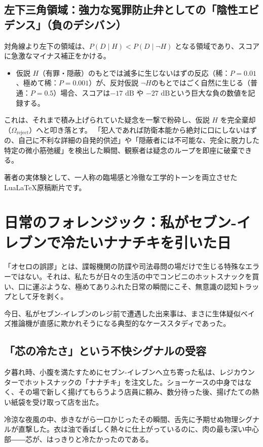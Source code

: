 \subsection{左下三角領域：強力な冤罪防止弁としての「陰性エビデンス」（負のデシバン）}
対角線より左下の領域は、$P(D \mid H) < P(D \mid \neg H)$ となる領域であり、スコアに急激なマイナス補正をかける。

\begin{itemize}
\item 仮説 $H$（有罪・隠蔽）のもとでは滅多に生じないはずの反応（稀：$P = 0.01$、極めて稀：$P = 0.001$）が、反対仮説 $\neg H$のもとではごく自然に生じる（普通：$P = 0.5$）場合、スコアは$-17\text{ dB}$ や $-27\text{ dB}$という巨大な負の数値を記録する。
\end{itemize}
これは、それまで積み上げられていた疑念を一撃で粉砕し、仮説 $H$ を完全棄却（$\Omega_{\mathrm{reject}}$）へと叩き落とす。
「犯人であれば防衛本能から絶対に口にしないはずの、自己に不利な詳細の自発的供述」や「隠蔽者には不可能な、完全に脱力した特定の微小筋弛緩」を検出した瞬間、観察者は疑念のループを即座に破棄できる。

著者の実体験として、一人称の臨場感と冷徹な工学的トーンを両立させたLuaLaTeX原稿断片です。

\section{日常のフォレンジック：私がセブン-イレブンで冷たいナナチキを引いた日}

「オセロの誤謬」とは、諜報機関の防諜や司法尋問の場だけで生じる特殊なエラーではない。それは、私たちが日々の生活の中でコンビニのホットスナックを買い、口に運ぶような、極めてありふれた日常の瞬間にこそ、無意識の認知トラップとして牙を剥く。

今日、私がセブン-イレブンのレジ前で遭遇した出来事は、まさに生体疑似ベイズ推論機が直感に欺かれそうになる典型的なケーススタディであった。

\subsection{「芯の冷たさ」という不快シグナルの受容}

夕暮れ時、小腹を満たすためにセブン-イレブンへ立ち寄った私は、レジカウンターでホットスナックの「ナナチキ」を注文した。ショーケースの中身ではなく、その場で新しく揚げてもらうよう店員に頼み、数分待った後、揚げたての熱い紙袋を受け取って店を出た。

冷涼な夜風の中、歩きながら一口かじったその瞬間、舌先に予期せぬ物理シグナルが直撃した。衣は油で香ばしく熱々に仕上がっているのに、肉の最も深い中心部――芯が、はっきりと冷たかったのである。

